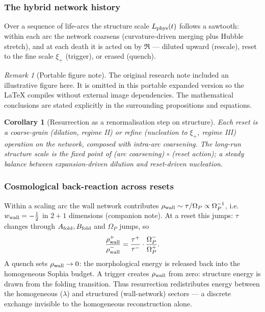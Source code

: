 \documentclass[11pt,a4paper]{article}
\newcommand{\Op}{\Omega_P}
\newcommand{\Af}{A_{\rm fold}}
\newcommand{\Bf}{B_{\rm fold}}
\newcommand{\reset}{\mathfrak R}
\theoremstyle{plain}
\newtheorem{corollary}{Corollary}[section]
\theoremstyle{definition}
\theoremstyle{remark}
\newtheorem{remark}{Remark}[section]
\begin{document}
\subsubsection{The hybrid network history}

Over a sequence of life-arcs the structure scale $L_{\rm phys}(t)$ follows a sawtooth: within each arc
the network coarsens (curvature-driven merging plus Hubble stretch), and at each death it is acted on by
$\reset$ --- diluted upward (rescale), reset to the fine scale $\xi_+$ (trigger), or erased (quench).


\begin{remark}[Portable figure note]
The original research note included an illustrative figure here. It is omitted in this portable expanded version so the LaTeX compiles without external image dependencies. The mathematical conclusions are stated explicitly in the surrounding propositions and equations.\end{remark}


\begin{corollary}[Resurrection as a renormalisation step on structure]
Each reset is a coarse-grain (dilation, regime II) or refine (nucleation to $\xi_+$, regime III)
operation on the network, composed with intra-arc coarsening. The long-run structure scale is the fixed
point of (arc coarsening)$\,\circ\,$(reset action); a steady balance between expansion-driven dilution
and reset-driven nucleation.
\end{corollary}

\subsubsection{Cosmological back-reaction across resets}

Within a scaling arc the wall network contributes $\rho_{\rm wall}\sim\tau/\Op\propto\Op^{-1}$, i.e.
$w_{\rm wall}=-\tfrac12$ in $2{+}1$ dimensions (companion note). At a reset this jumps: $\tau$ changes
through $\Af,\Bf$ and $\Op$ jumps, so
\begin{equation}
\frac{\rho_{\rm wall}^+}{\rho_{\rm wall}^-}=\frac{\tau^+}{\tau^-}\cdot\frac{\Op^-}{\Op^+}.
\end{equation}
A quench sets $\rho_{\rm wall}\to0$: the morphological energy is released back into the homogeneous Sophia
budget. A trigger creates $\rho_{\rm wall}$ from zero: structure energy is drawn from the folding
transition. Thus resurrection redistributes energy between the homogeneous ($\lambda$) and structured
(wall-network) sectors --- a discrete exchange invisible to the homogeneous reconstruction alone.
\end{document}
